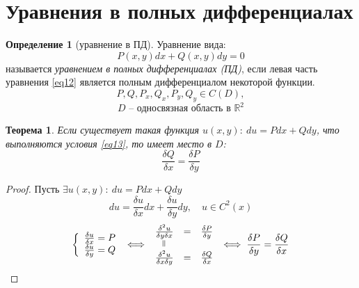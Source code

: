 \documentclass[11pt,a4paper,oneside]{report}
\newcommand{\verteq}[0]{\rotatebox{90}{$=$}}
\theoremstyle{definition}
\newtheorem{definition}{Определение}[section]
\theoremstyle{plain}
\newtheorem{theorem}{Теорема}[section]
\theoremstyle{remark}
\begin{document}
\section{Уравнения в полных дифференциалах}

\begin{definition}[уравнение в ПД]
    Уравнение вида:
    \begin{equation}\label{eq12}
        P(x,y)dx + Q(x,y)dy = 0
    \end{equation}
    называется \emph{уравнением в полных дифференциалах (ПД)}, если левая часть уравнения \ref{eq12} является полным дифференциалом некоторой функции.
    \begin{equation}\label{eq13}
        P,Q,P_x,Q_x,P_y,Q_y \in C(D),
    \end{equation}
    \begin{equation*}
        D\text{ -- односвязная область в }\mathbb{R}^2
    \end{equation*}
\end{definition}

\begin{theorem}
    Если существует такая функция $u(x,y): \ du = Pdx + Qdy$, что выполняются условия \ref{eq13}, то имеет место в $D$:
    \begin{equation}\label{eq14}
        \frac{\delta Q}{\delta x} = \frac{\delta P}{\delta y}
    \end{equation}
\end{theorem}

\begin{proof}
    Пусть $\exists u(x,y): \ du = Pdx + Qdy$
    \begin{equation*}
        du = \frac{\delta u}{\delta x}dx + \frac{\delta u}{\delta y}dy,\quad u\in C^2(x)
    \end{equation*}
    \begin{equation*}
        \left\{\begin{array}{l}
            \frac{\delta u}{\delta x} = P \\
            \frac{\delta u}{\delta y} = Q
        \end{array}\right. \iff \begin{array}{ccc}
            \frac{\delta^2 u}{\delta y \delta x} & = & \frac{\delta P}{\delta y} \\
            \verteq                              &   &                           \\
            \frac{\delta^2 u}{\delta x \delta y} & = & \frac{\delta Q}{\delta x}
        \end{array} \iff \frac{\delta P}{\delta y} = \frac{\delta Q}{\delta x}
    \end{equation*}
\end{proof}
\end{document}
